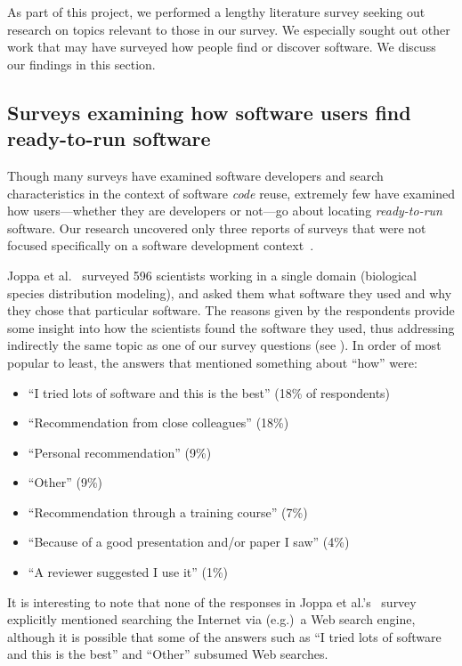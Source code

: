 \documentclass{casicswhitepaper}
\begin{document}
As part of this project, we performed a lengthy literature survey seeking out research on topics relevant to those in our survey.  We especially sought out other work that may have surveyed how people find or discover software.  We discuss our findings in this section.


\subsection{Surveys examining how software users find ready-to-run software}

Though many surveys have examined software developers and search characteristics in the context of software \emph{code} reuse, extremely few have examined how users---whether they are developers or not---go about locating \emph{ready-to-run} software.  Our research uncovered only three reports of surveys that were not focused specifically on a software development context~\cite{joppa2013troubling, huang2013provenance, lawrence2015science}.

Joppa et al.~\cite{joppa2013troubling} surveyed 596 scientists working in a single domain (biological species distribution modeling), and asked them what software they used and why they chose that particular software.  The reasons given by the respondents provide some insight into how the scientists found the software they used, thus addressing indirectly the same topic as one of our survey questions (see ).  In order of most popular to least, the answers that mentioned something about ``how'' were:

\begin{itemize}[itemsep=-0.5ex]

\item ``I tried lots of software and this is the best'' (18\% of respondents)
\item ``Recommendation from close colleagues'' (18\%)
\item ``Personal recommendation'' (9\%)
\item ``Other'' (9\%)
\item ``Recommendation through a training course'' (7\%)
\item ``Because of a good presentation and/or paper I saw'' (4\%)
\item ``A reviewer suggested I use it'' (1\%)

\end{itemize}

It is interesting to note that none of the responses in Joppa et al.'s~\cite{joppa2013troubling} survey explicitly mentioned searching the Internet via (e.g.)\ a Web search engine, although it is possible that some of the answers such as ``I tried lots of software and this is the best'' and ``Other'' subsumed Web searches.
\end{document}
